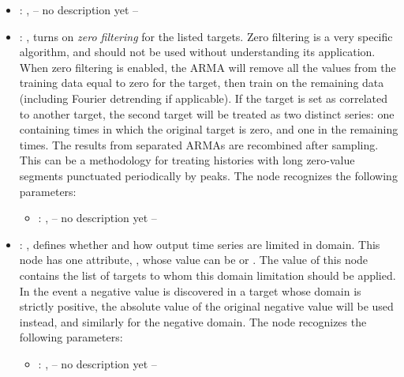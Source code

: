 \begin{itemize}
    \item {}: , 
      -- no description yet --

    \item {}: , 
      turns on \emph{zero filtering}                                                  for the listed
      targets. Zero filtering is a very specific algorithm, and should not be used without
      understanding its application.  When zero filtering is enabled, the ARMA will remove all the
      values from                                                  the training data equal to zero
      for the target, then train on the remaining data (including Fourier detrending
      if applicable). If the target is set as correlated to another target, the second target will
      be treated as                                                  two distinct series: one
      containing times in which the original target is zero, and one in the remaining
      times. The results from separated ARMAs are recombined after sampling. This can be a
      methodology for                                                  treating histories with long
      zero-value segments punctuated periodically by peaks.
      The  node recognizes the following parameters:
        \begin{itemize}
          \item {}: , 
            -- no description yet --
      \end{itemize}

    \item {}: , 
      defines whether and how output                                                    time series
      are limited in domain. This node has one attribute, , whose value can be
       or . The value of this node contains the list of
      targets to whom                                                    this domain limitation
      should be applied. In the event a negative value is discovered in a target whose
      domain is strictly positive, the absolute value of the original negative value will be used
      instead, and                                                    similarly for the negative
      domain.
      The  node recognizes the following parameters:
        \begin{itemize}
          \item {}: , 
            -- no description yet --
      \end{itemize}
  \end{itemize}

